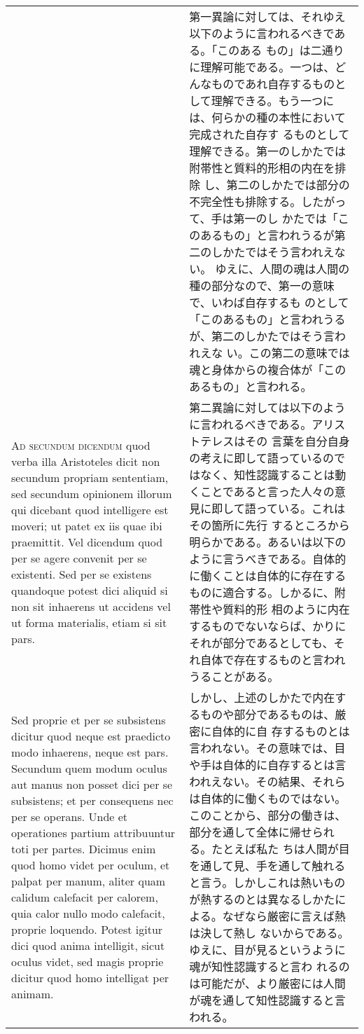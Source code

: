 \documentclass[10pt]{jsarticle} %
\begin{document}
\begin{longtable}{p{21em}p{21em}}
&

第一異論に対しては、それゆえ以下のように言われるべきである。「このある
もの」は二通りに理解可能である。一つは、どんなものであれ自存するものと
して理解できる。もう一つには、何らかの種の本性において完成された自存す
るものとして理解できる。第一のしかたでは附帯性と質料的形相の内在を排除
し、第二のしかたでは部分の不完全性も排除する。したがって、手は第一のし
かたでは「このあるもの」と言われうるが第二のしかたではそう言われえない。
ゆえに、人間の魂は人間の種の部分なので、第一の意味で、いわば自存するも
のとして「このあるもの」と言われうるが、第二のしかたではそう言われえな
い。この第二の意味では魂と身体からの複合体が「このあるもの」と言われる。


\\



{\scshape Ad secundum dicendum} quod verba illa Aristoteles dicit non
secundum propriam sententiam, sed secundum opinionem illorum qui
dicebant quod intelligere est moveri; ut patet ex iis quae ibi
praemittit. Vel dicendum quod per se agere convenit per se
existenti. Sed per se existens quandoque potest dici aliquid si non
sit inhaerens ut accidens vel ut forma materialis, etiam si sit pars.


&

第二異論に対しては以下のように言われるべきである。アリストテレスはその
言葉を自分自身の考えに即して語っているのではなく、知性認識することは動
くことであると言った人々の意見に即して語っている。これはその箇所に先行
するところから明らかである。あるいは以下のように言うべきである。自体的
に働くことは自体的に存在するものに適合する。しかるに、附帯性や質料的形
相のように内在するものでないならば、かりにそれが部分であるとしても、そ
れ自体で存在するものと言われうることがある。


\\

Sed proprie et per se subsistens dicitur quod neque est praedicto modo
inhaerens, neque est pars. Secundum quem modum oculus aut manus non
posset dici per se subsistens; et per consequens nec per se
operans. Unde et operationes partium attribuuntur toti per
partes. Dicimus enim quod homo videt per oculum, et palpat per manum,
aliter quam calidum calefacit per calorem, quia calor nullo modo
calefacit, proprie loquendo. Potest igitur dici quod anima intelligit,
sicut oculus videt, sed magis proprie dicitur quod homo intelligat per
animam.


&

しかし、上述のしかたで内在するものや部分であるものは、厳密に自体的に自
存するものとは言われない。その意味では、目や手は自体的に自存するとは言
 われえない。その結果、それらは自体的に働くものではない。
このことから、部分の働きは、部分を通して全体に帰せられる。たとえば私た
 ちは人間が目を通して見、手を通して触れると言う。しかしこれは熱いもの
 が熱するのとは異なるしかたによる。なぜなら厳密に言えば熱は決して熱し
 ないからである。ゆえに、目が見るというように魂が知性認識すると言わ
 れるのは可能だが、より厳密には人間が魂を通して知性認識すると言われる。



\end{longtable}
\end{document}
